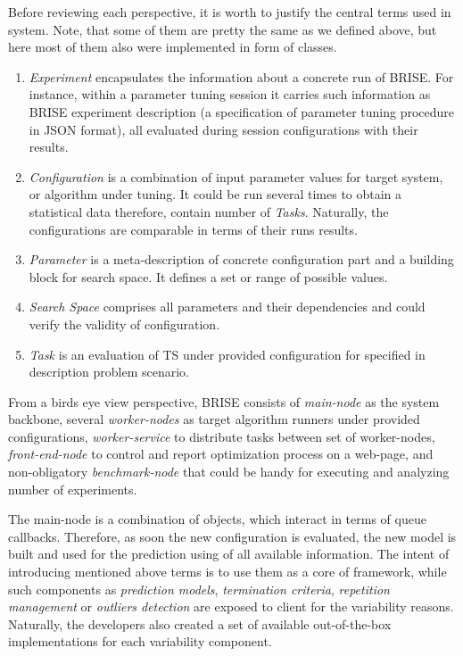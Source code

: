 Before reviewing each perspective, it is worth to justify the central terms used in system. Note, that some of them are pretty the same as we defined above, but here most of them also were implemented in form of classes.
\begin{enumerate}
	\item \emph{Experiment} encapsulates the information about a concrete run of BRISE. For instance, within a parameter tuning session it carries such information as BRISE experiment description (a specification of parameter tuning procedure in JSON format), all evaluated during session configurations with their results.

	\item \emph{Configuration} is a combination of input parameter values for target system, or algorithm under tuning. It could be run several times to obtain a statistical data therefore, contain number of \emph{Tasks}. Naturally, the configurations are comparable in terms of their runs results.

	\item \emph{Parameter} is a meta-description of concrete configuration part and a building block for search space. It defines a set or range of possible values.

	\item \emph{Search Space} comprises all parameters and their dependencies and could verify the validity of configuration.

	\item \emph{Task} is an evaluation of TS under provided configuration for specified in description problem scenario.
\end{enumerate}

From a birds eye view perspective, BRISE consists of \emph{main-node} as the system backbone, several \emph{worker-nodes} as target algorithm runners under provided configurations, \emph{worker-service} to distribute tasks between set of worker-nodes, \emph{front-end-node} to control and report optimization process on a web-page, and non-obligatory \emph{benchmark-node} that could be handy for executing and analyzing number of experiments.

The main-node is a combination of objects, which interact in terms of queue callbacks. Therefore, as soon the new configuration is evaluated, the new model is built and used for the prediction using of all available information. The intent of introducing mentioned above terms is to use them as a core of framework, while such components as \emph{prediction models}, \emph{termination criteria}, \emph{repetition management} or \emph{outliers detection} are exposed to client for the variability reasons. Naturally, the developers also created a set of available out-of-the-box implementations for each variability component.

